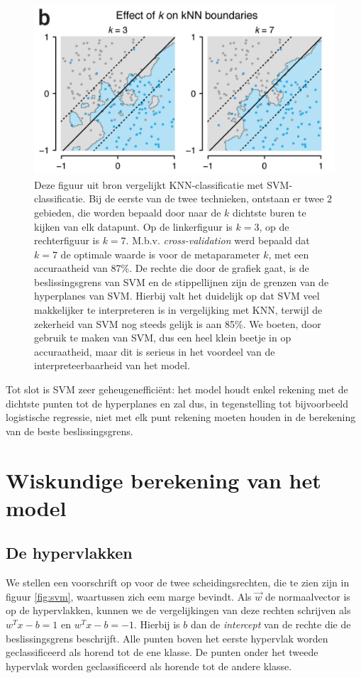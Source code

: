\documentclass[TeamE-eindrapport]{subfiles}
\begin{document}
	\begin{figure}
		\centering
		\includegraphics[width=.6\textwidth]{KNN-vs-SVM.PNG}
		\caption{Deze figuur uit bron \cite{bzdok2018machine} vergelijkt KNN-classificatie met SVM-classificatie. Bij de eerste van de twee technieken, ontstaan er twee 2 gebieden, die worden bepaald door naar de \(k\) dichtste buren te kijken van elk datapunt. Op de linkerfiguur is \(k=3\), op de rechterfiguur is \(k=7\). M.b.v. \textit{cross-validation} werd bepaald dat \(k=7\) de optimale waarde is voor de metaparameter \(k\), met een accuraatheid van 87\%. De rechte die door de grafiek gaat, is de beslissingsgrens van SVM en de stippellijnen zijn de grenzen van de hyperplanes van SVM. Hierbij valt het duidelijk op dat SVM veel makkelijker te interpreteren is in vergelijking met KNN, terwijl de zekerheid van SVM nog steeds gelijk is aan 85\%. We boeten, door gebruik te maken van SVM, dus een heel klein beetje in op accuraatheid, maar dit is serieus in het voordeel van de interpreteerbaarheid van het model.}
		\label{fig:KNNvsSVM}
	\end{figure}
	
	Tot slot is SVM zeer geheugenefficiënt: het model houdt enkel rekening met de dichtste punten tot de hyperplanes en zal dus, in tegenstelling tot bijvoorbeeld logistische regressie, niet met elk punt rekening moeten houden in de berekening van de beste beslissingsgrens.
	
	\section{Wiskundige berekening van het model}
	
	\subsection{De hypervlakken}
	
	We stellen een voorschrift op voor de twee scheidingsrechten, die te zien zijn in figuur \ref{fig:svm}, waartussen zich eem marge bevindt. Als \(\vec{w}\) de normaalvector is op de hypervlakken, kunnen we de vergelijkingen van deze rechten schrijven als \(w^Tx-b=1\) en \(w^Tx-b=-1\). Hierbij is \(b\) dan de \textit{intercept} van de rechte die de beslissingsgrens beschrijft. Alle punten boven het eerste hypervlak worden geclassificeerd als horend tot de ene klasse. De punten onder het tweede hypervlak worden geclassificeerd als horende tot de andere klasse.
	
\end{document}
